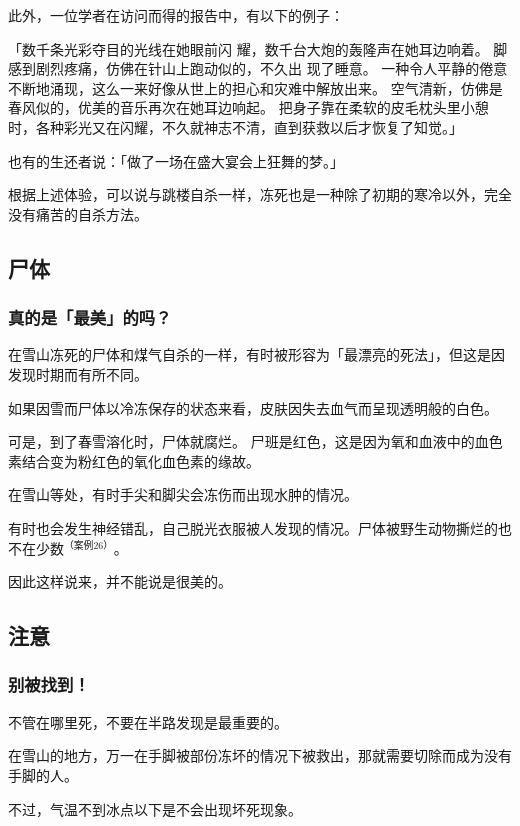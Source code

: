 \documentclass[UTF8]{ctexart}
\begin{document}
此外，一位学者在访问而得的报告中，有以下的例子：

「数千条光彩夺目的光线在她眼前闪 耀，数千台大炮的轰隆声在她耳边响着。
脚感到剧烈疼痛，仿佛在针山上跑动似的，不久出 现了睡意。
一种令人平静的倦意不断地涌现，这么一来好像从世上的担心和灾难中解放出来。
空气清新，仿佛是春风似的，优美的音乐再次在她耳边响起。
把身子靠在柔软的皮毛枕头里小憩时，各种彩光又在闪耀，不久就神志不清，直到获救以后才恢复了知觉。」 

也有的生还者说：「做了一场在盛大宴会上狂舞的梦。」

根据上述体验，可以说与跳楼自杀一样，冻死也是一种除了初期的寒冷以外，完全没有痛苦的自杀方法。

\subsection{尸体}

\subsubsection*{真的是「最美」的吗？}


在雪山冻死的尸体和煤气自杀的一样，有时被形容为「最漂亮的死法」，但这是因发现时期而有所不同。

如果因雪而尸体以冷冻保存的状态来看，皮肤因失去血气而呈现透明般的白色。

可是，到了春雪溶化时，尸体就腐烂。
尸班是红色，这是因为氧和血液中的血色素结合变为粉红色的氧化血色素的缘故。

在雪山等处，有时手尖和脚尖会冻伤而出现水肿的情况。

有时也会发生神经错乱，自己脱光衣服被人发现的情况。尸体被野生动物撕烂的也不在少数$^{（案例 26）}$。

因此这样说来，并不能说是很美的。

\subsection{注意}

\subsubsection*{别被找到！}

不管在哪里死，不要在半路发现是最重要的。

在雪山的地方，万一在手脚被部份冻坏的情况下被救出，那就需要切除而成为没有手脚的人。

不过，气温不到冰点以下是不会出现坏死现象。
\end{document}
